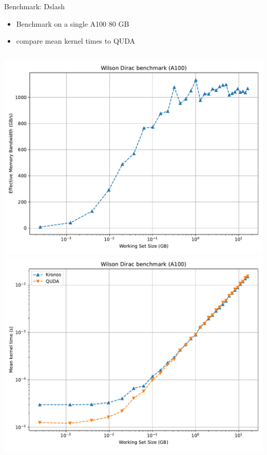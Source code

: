 \begin{frame}{Benchmark: Dslash}

  \begin{itemize}
    \item Benchmark on a single A100 80 GB
    \item compare mean kernel times to QUDA
  \end{itemize}

  \begin{columns}
      \includegraphics[width=\textwidth]{figs/Wilson_Dirac_bw_A100.pdf}
      \includegraphics[width=\textwidth]{figs/Wilson_Dirac_time_A100.pdf}
  \end{columns}
\end{frame}

